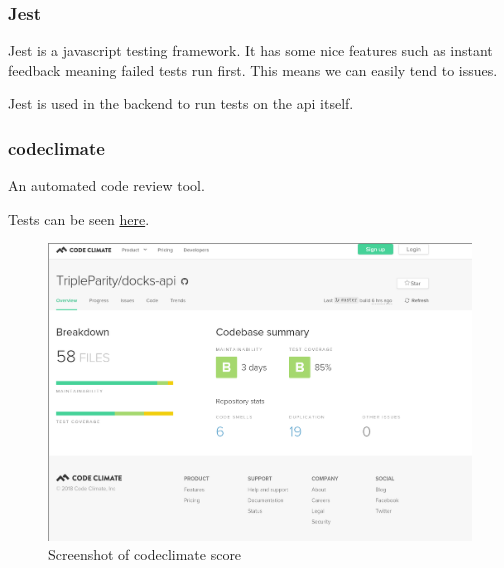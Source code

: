\documentclass[]{article}
\begin{document}
\subsubsection{Jest}
Jest is a javascript testing framework.
It has some nice features such as instant feedback meaning
failed tests run first. This means we can easily tend to issues.

Jest is used in the backend to run tests on the api itself.

\pagebreak

\subsubsection{codeclimate}
An automated code review tool.

Tests can be seen \href{https://codeclimate.com/github/TripleParity/docker-ui}{here}.
\begin{figure}[H]
	\centering
	\includegraphics[scale=0.5]{codeclimate_api.png}
	\caption{Screenshot of codeclimate score}
\end{figure}
\end{document}
